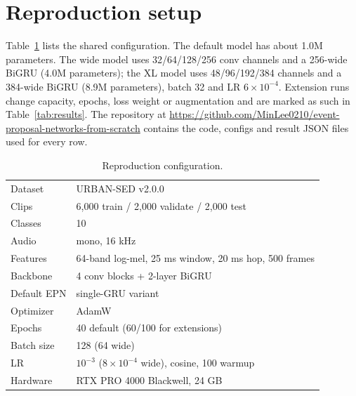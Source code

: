 \section{Reproduction setup}

\begin{sloppypar}
Table~\ref{tab:config} lists the shared configuration. The default model has
about 1.0M parameters. The wide model uses 32/64/128/256 conv channels and a
256-wide BiGRU (4.0M parameters); the XL model uses 48/96/192/384 channels and
a 384-wide BiGRU (8.9M parameters), batch 32 and LR $6\times10^{-4}$. Extension
runs change capacity, epochs, loss weight or augmentation and are marked as
such in Table~\ref{tab:results}. The repository at
\url{https://github.com/MinLee0210/event-proposal-networks-from-scratch}
contains the code, configs and result JSON files used for every row.
\end{sloppypar}

\begin{table}[!ht]
\centering
\caption{Reproduction configuration.}
\label{tab:config}
\begin{tabular}{ll}
\toprule
Dataset & URBAN-SED v2.0.0 \\
Clips & 6{,}000 train / 2{,}000 validate / 2{,}000 test \\
Classes & 10 \\
Audio & mono, 16 kHz \\
Features & 64-band log-mel, 25 ms window, 20 ms hop, 500 frames \\
Backbone & 4 conv blocks + 2-layer BiGRU \\
Default EPN & single-GRU variant \\
Optimizer & AdamW \\
Epochs & 40 default (60/100 for extensions) \\
Batch size & 128 (64 wide) \\
LR & $10^{-3}$ ($8\times10^{-4}$ wide), cosine, 100 warmup \\
Hardware & RTX PRO 4000 Blackwell, 24 GB \\
\bottomrule
\end{tabular}
\end{table}
